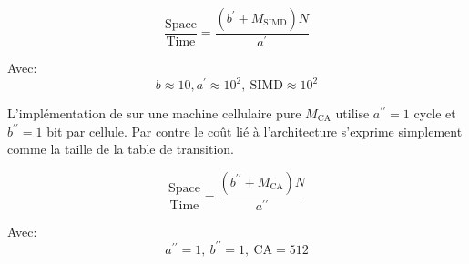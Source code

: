 \begin{equation}
  \frac{\text{Space}}{\text{Time}} = \frac{(b^{\prime}+M_{\text{SIMD}})N}{a^{\prime}}
  \label{eq-life-simd}
\end{equation}

Avec:\[b \approx 10,a^{\prime} \approx 10^2,~\text{SIMD} \approx 10^2\]

L'impl\'ementation de  sur une machine cellulaire pure $M_{\text{CA}}$
utilise $a^{\prime\prime} = 1$ cycle et  $b^{\prime\prime} = 1$ bit par
cellule. %
Par contre le co\^ut li\'e \`a l'architecture s'exprime simplement comme la
taille de la table de transition. %

\begin{equation}
  \frac{\text{Space}}{\text{Time}} =
  \frac{(b^{\prime\prime}+M_{\text{CA}})N}{a^{\prime\prime}}
  \label{eq-life-cell}
\end{equation}

Avec:\[a^{\prime\prime} = 1,~b^{\prime\prime} = 1,~\text{CA} = 512\]

